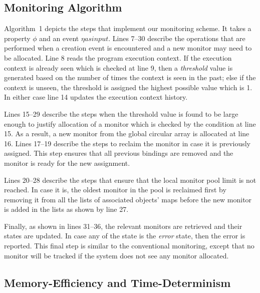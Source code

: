 \label{algo:monitoring}



\subsection{Monitoring Algorithm}
\label{subsec:algo}

Algorithm~1 depicts the steps that implement our monitoring scheme. It takes a
property $\phi$ and an event $\eta as input. $ Lines 7--30 
describe the operations that are performed when a creation event is encountered 
and a new monitor may need to be allocated. Line 8 reads the program execution 
context. If the execution context is already seen which is checked at line 9, 
then a \textit{threshold} value is generated based on the number of times the 
context is seen in the past; else if the context is unseen, the threshold is 
assigned the highest possible value which is 1. In either case line 14 updates 
the execution context history.

Lines 15--29 describe the steps when the threshold value is found to be large 
enough to justify allocation of a monitor which is checked by the condition at 
line 15. As a result, a new monitor from the global circular array is allocated
at line 16. Lines 17--19 describe the steps to reclaim the monitor in case it is previously 
assigned. This step ensures that all previous bindings are removed and the 
monitor is ready for the new assignment.

Lines 20--28 describe the steps that ensure that the local monitor pool limit is 
not reached. In case it is, the oldest monitor in the pool is reclaimed first by 
removing it from all the lists of associated objects' maps before the new monitor 
is added in the lists as shown by line 27.

Finally, as shown in lines 31--36, the relevant monitors are retrieved and their 
states are updated. In case any of the state is the \textit{error} state, then 
the error is reported. This final step is similar to the conventional 
monitoring, except that no monitor will be tracked if the system does not see 
any monitor allocated.


\subsection{Memory-Efficiency and Time-Determinism}
\label{subsec:efficiencyanddeterminism}

